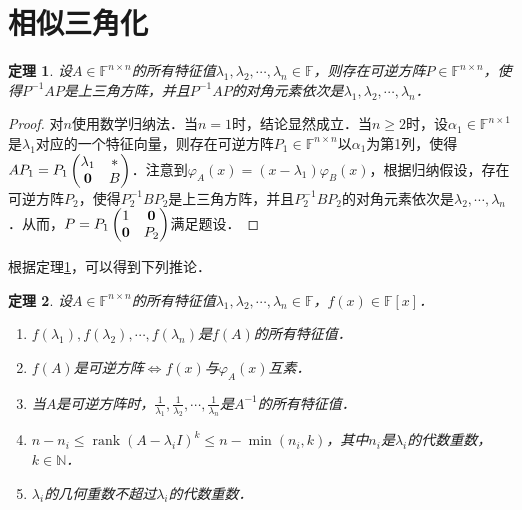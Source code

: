 \documentclass[a4paper,fontset=windows]{ctexbook}
\newtheorem{theorem}{定理}[chapter]
\theoremstyle{definition}
\DeclareMathOperator{\rank}{rank}
\renewcommand{\le}{\leqslant}
\renewcommand{\ge}{\geqslant}
\begin{document}
\clearpage\section{相似三角化}

\begin{theorem}\label{thm5.5}
设$A\in\mathbb{F}^{n\times n}$的所有特征值$\lambda_1,\lambda_2,\cdots,\lambda_n\in\mathbb{F}$，则存在可逆方阵$P\in\mathbb{F}^{n\times n}$，使得$P^{-1}AP$是上三角方阵，并且$P^{-1}AP$的对角元素依次是$\lambda_1,\lambda_2,\cdots,\lambda_n$．
\end{theorem}

\begin{proof}
对$n$使用数学归纳法．当$n=1$时，结论显然成立．当$n\ge 2$时，设$\alpha_1\in\mathbb{F}^{n\times 1}$是$\lambda_1$对应的一个特征向量，则存在可逆方阵$P_1\in\mathbb{F}^{n\times n}$以$\alpha_1$为第1列，使得$AP_1=P_1\begin{pmatrix}\lambda_1&* \\ {\bf 0}&B\end{pmatrix}$．注意到$\varphi_A(x)=(x-\lambda_1)\varphi_B(x)$，根据归纳假设，存在可逆方阵$P_2$，使得$P_2^{-1}BP_2$是上三角方阵，并且$P_2^{-1}BP_2$的对角元素依次是$\lambda_2,\cdots,\lambda_n$．从而，$P=P_1\begin{pmatrix}1&{\bf 0} \\ {\bf 0}&P_2\end{pmatrix}$满足题设．
\end{proof}

根据定理\ref{thm5.5}，可以得到下列推论．

\begin{theorem}\label{thm5.6}
设$A\in\mathbb{F}^{n\times n}$的所有特征值$\lambda_1,\lambda_2,\cdots,\lambda_n\in\mathbb{F}$，$f(x)\in\mathbb{F}[x]$．
\begin{enumerate}
\item $f(\lambda_1),f(\lambda_2),\cdots,f(\lambda_n)$是$f(A)$的所有特征值．

\item $f(A)$是可逆方阵$\Leftrightarrow f(x)$与$\varphi_A(x)$互素．

\item 当$A$是可逆方阵时，$\frac{1}{\lambda_1},\frac{1}{\lambda_2},\cdots,\frac{1}{\lambda_n}$是$A^{-1}$的所有特征值．

\item $n-n_i\le\rank(A-\lambda_iI)^k\le n-\min(n_i,k)$，其中$n_i$是$\lambda_i$的代数重数，$k\in\mathbb{N}$．

\item $\lambda_i$的几何重数不超过$\lambda_i$的代数重数．
\end{enumerate}
\end{theorem}
\end{document}
